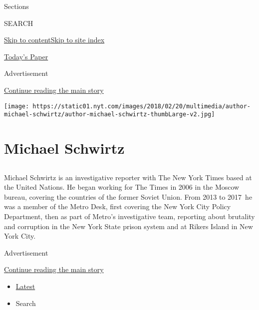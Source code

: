 Sections

SEARCH

\protect\hyperlink{site-content}{Skip to
content}\protect\hyperlink{site-index}{Skip to site index}

\href{https://myaccount.nytimes.com/auth/login?response_type=cookie\&client_id=vi}{}

\href{https://www.nytimes.com/section/todayspaper}{Today's Paper}

Advertisement

\protect\hyperlink{after-top}{Continue reading the main story}

\texttt{[image: https://static01.nyt.com/images/2018/02/20/multimedia/author-michael-schwirtz/author-michael-schwirtz-thumbLarge-v2.jpg]}

\hypertarget{michael-schwirtz}{%
\section{Michael Schwirtz}\label{michael-schwirtz}}

\subsection{}

Michael Schwirtz is an investigative reporter with The New York Times
based at the United Nations. He began working for The Times in 2006 in
the Moscow bureau, covering the countries of the former Soviet Union.
From 2013 to 2017~he was a member of the Metro Desk, first covering the
New York City Policy Department, then as part of Metro's investigative
team, reporting about brutality and corruption in the New York State
prison system and at Rikers Island in New York City.~

Advertisement

\protect\hyperlink{after-mid1}{Continue reading the main story}

\begin{itemize}
\tightlist
\item
  \protect\hyperlink{stream-panel}{Latest}
\item
  Search
\end{itemize}

